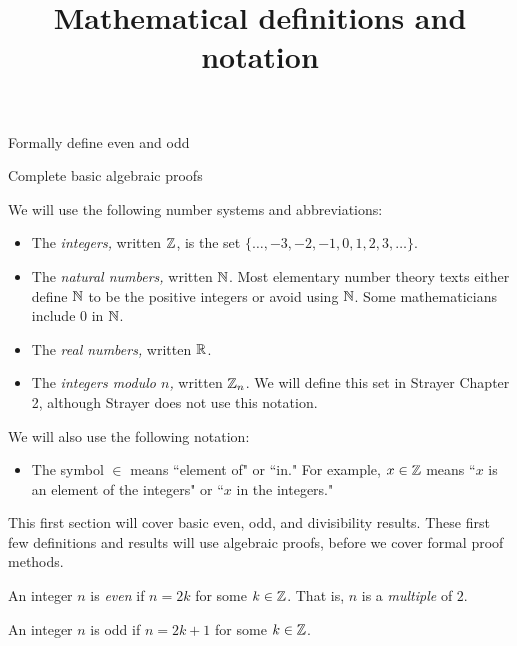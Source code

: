 \documentclass{ximera}
\title{Mathematical definitions and notation}
\begin{document}
\begin{abstract}
\end{abstract}
\maketitle


\begin{obj}
  \item Formally define even and odd
  \item Complete basic algebraic proofs
\end{obj}



\begin{defn}\label{defn:number-systems} 
  We will use the following number systems and abbreviations:
  \begin{itemize}
    \item The \emph{integers,} written $\mathbb Z$, is the set $\{\dots,-3,-2,-1,0,1,2,3,\dots\}$. 
    \item The \emph{natural numbers,} written $\mathbb N$. Most elementary number theory texts either define $\mathbb N$ to be the positive integers or avoid using $\mathbb N$. Some mathematicians include $0$ in $\mathbb N$.
    \item The \emph{real numbers,} written $\mathbb R$.
    \item The \emph{integers modulo $n$,} written $\mathbb Z_n$. We will define this set in Strayer Chapter 2, although Strayer does not use this notation.
  \end{itemize}
  We will also use the following notation:
  \begin{itemize}
    \item The symbol $\in$ means ``element of" or ``in." For example, $x\in\mathbb Z$ means ``$x$ is an element of the integers" or ``$x$ in the integers."
  \end{itemize}
\end{defn}

This first section will cover basic even, odd, and divisibility results. These first few definitions and results will use algebraic proofs, before we cover formal proof methods.

\begin{defn}\label{defn:even-odd-form}
  An integer $n$ is \emph{even} if $n=2k$ for some $k\in\mathbb Z$. That is, $n$ is a \emph{multiple} of $2.$

  An integer $n$ is odd if $n=2k+1$ for some $k\in\mathbb Z$.
\end{defn}
\end{document}
